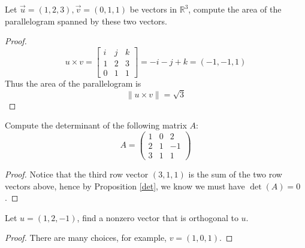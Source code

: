\documentclass[openany]{book}
\newcommand{\R}{\mathbb{R}}
\begin{document}
\begin{prob}
    Let $\vec{u}=(1,2,3), \vec{v}=(0,1,1)$ be vectors in $\R^3$, compute the area of the parallelogram spanned by these two vectors.
\end{prob}
\begin{proof}
    \begin{equation*}
        u\times v=\begin{bmatrix}
            i&j&k\\
            1&2&3\\
            0&1&1
        \end{bmatrix}=-i-j+k=(-1,-1,1)
    \end{equation*}
    Thus the area of the parallelogram is 
    \begin{equation*}
        \|u\times v\|=\sqrt{3}
    \end{equation*}
\end{proof}


\begin{prob}
    Compute the determinant of the following matrix $A$:
    \begin{equation*}
        A=\begin{pmatrix}
            1&0&2\\
            2&1&-1\\
            3&1&1
        \end{pmatrix}
    \end{equation*}
\end{prob}
\begin{proof}
    Notice that the third row vector $(3,1,1)$ is the sum of the two row vectors above, hence by Proposition \ref{det}, we know we must have $\det(A)=0$.
\end{proof}
\begin{prob}
    Let $u=(1,2,-1)$, find a nonzero vector that is orthogonal to $u$.
\end{prob}
\begin{proof}
    There are many choices, for example, $v=(1,0,1)$.
\end{proof}
\end{document}
